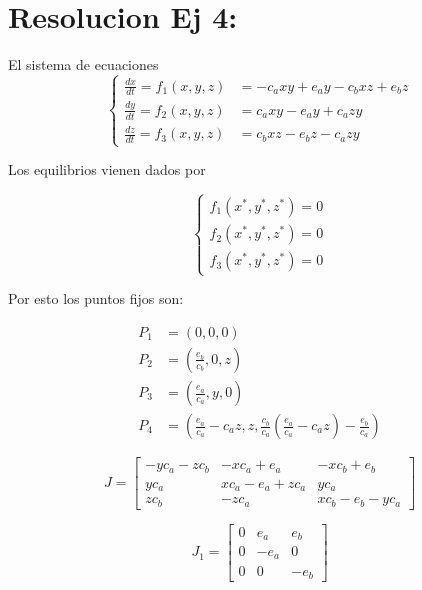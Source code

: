 \documentclass[twocolumn,aps,prl]{revtex4-1}
\begin{document}
% 
%                             
% 

\section{Resolucion Ej 4:}

El sistema de ecuaciones
$$
\left\{
\begin{aligned}
\frac{d x}{d t} = f_1(x, y, z) &=-c_{a} x y+e_{a} y-c_{b} x z+e_{b} z \\
\frac{d y}{d t} = f_2(x, y, z) &=c_{a} x y-e_{a} y+c_{a} z y          \\
\frac{d z}{d t} = f_3(x, y, z) &=c_{b} x z-e_{b} z-c_{a} z y            
\end{aligned}
\right.
$$

Los equilibrios vienen dados por 

$$
\left\{
\begin{aligned}
    f_1(x^*, y^*, z^*) = 0\\ 
    f_2(x^*, y^*, z^*) = 0\\ 
    f_3(x^*, y^*, z^*) = 0   
\end{aligned}
\right.
$$

Por esto los puntos fijos son:

$$
\begin{aligned}
    P_1 &= (0, 0, 0) \\ 
    P_2 &= (\frac{e_b}{c_b}, 0, z) \\ 
    P_3 &= (\frac{e_a}{c_a}, y, 0) \\ 
    P_4 &= (\frac{e_a}{c_a} - c_a z, z, \frac{c_b}{c_a} (\frac{e_a}{c_a} - c_a z) - \frac{e_b}{c_a}) 
\end{aligned}
$$


$$
J = 
\begin{bmatrix}  
    - y c_a - z c_b & - x c_a + e_a & - x c_b + e_b \\
    y c_a & x c_a - e_a + z c_a & y c_a \\
    z c_b & - z c_a & x c_b - e_b - y c_a 
\end{bmatrix}
$$

$$
J_1 = 
\begin{bmatrix}
    0 & e_a & e_b \\
    0 & - e_a & 0 \\
    0 & 0 & - e_b 
\end{bmatrix}
$$
\end{document}
